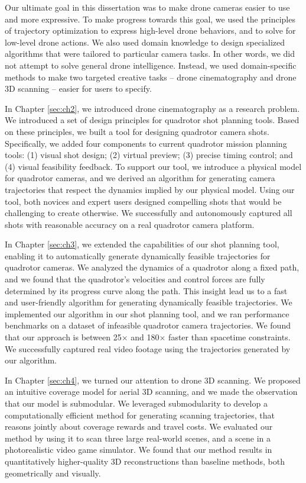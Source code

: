 \label{sec:ch5}

Our ultimate goal in this dissertation was to make drone cameras easier to use and more expressive.
To make progress towards this goal, we used the principles of trajectory optimization to express high-level drone behaviors, and to solve for low-level drone actions.
We also used domain knowledge to design specialized algorithms that were tailored to particular camera tasks.
In other words, we did not attempt to solve general drone intelligence.
Instead, we used domain-specific methods to make two targeted creative tasks -- drone cinematography and drone 3D scanning -- easier for users to specify.

In Chapter \ref{sec:ch2}, we introduced drone cinematography as a research problem.
We introduced a set of design principles for quadrotor shot planning tools.
Based on these principles, we built a tool for designing quadrotor camera shots.
Specifically, we added four components to current quadrotor mission planning tools: (1) visual shot design; (2) virtual preview; (3) precise timing control; and (4) visual feasibility feedback. 
To support our tool, we introduce a physical model for quadrotor cameras, and we derived an algorithm for generating camera trajectories that respect the dynamics implied by our physical model.
Using our tool, both novices and expert users designed compelling shots that would be challenging to create otherwise.
We successfully and autonomously captured all shots with reasonable accuracy on a real quadrotor camera platform.

In Chapter \ref{sec:ch3}, we extended the capabilities of our shot planning tool, enabling it to automatically generate dynamically feasible trajectories for quadrotor cameras.
We analyzed the dynamics of a quadrotor along a fixed path, and we found that the quadrotor's velocities and control forces are fully determined by its progress curve along the path.
This insight lead us to a fast and user-friendly algorithm for generating dynamically feasible trajectories.
We implemented our algorithm in our shot planning tool, and we ran performance benchmarks on a dataset of infeasible quadrotor camera trajectories.
We found that our approach is between 25$\times$ and 180$\times$ faster than spacetime constraints.
We successfully captured real video footage using the trajectories generated by our algorithm.

In Chapter \ref{sec:ch4}, we turned our attention to drone 3D scanning.
We proposed an intuitive coverage model for aerial 3D scanning, and we made the observation that our model is submodular.
We leveraged submodularity to develop a computationally efficient method for generating scanning trajectories, that reasons jointly about coverage rewards and travel costs.
We evaluated our method by using it to scan three large real-world scenes, and a scene in a photorealistic video game simulator.
We found that our method results in quantitatively higher-quality 3D reconstructions than baseline methods, both geometrically and visually.

